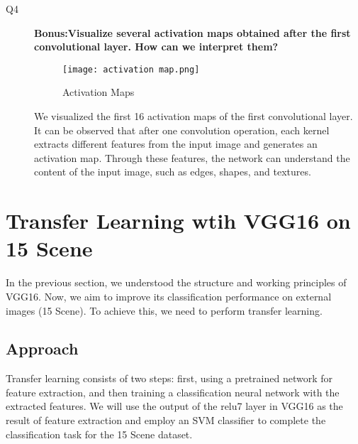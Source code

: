 \documentclass{rapportECL}
\begin{document}
\begin{description}
    \item[Q4] \textbf{Bonus:Visualize several activation maps obtained after the first convolutional layer. How can we interpret them?}
    
    \begin{figure}[H]
        \centering
        \texttt{[image: activation map.png]}
        \caption{Activation Maps}
        \label{fig:enter-label}
    \end{figure}
    We visualized the first 16 activation maps of the first convolutional layer. It can be observed that after one convolution operation, each kernel extracts different features from the input image and generates an activation map. Through these features, the network can understand the content of the input image, such as edges, shapes, and textures.

\end{description}

\section{Transfer Learning wtih VGG16 on 15 Scene}
In the previous section, we understood the structure and working principles of VGG16. Now, we aim to improve its classification performance on external images (15 Scene). To achieve this, we need to perform transfer learning.

\subsection{Approach}
Transfer learning consists of two steps: first, using a pretrained network for feature extraction, and then training a classification neural network with the extracted features. We will use the output of the relu7 layer in VGG16 as the result of feature extraction and employ an SVM classifier to complete the classification task for the 15 Scene dataset.
\end{document}
